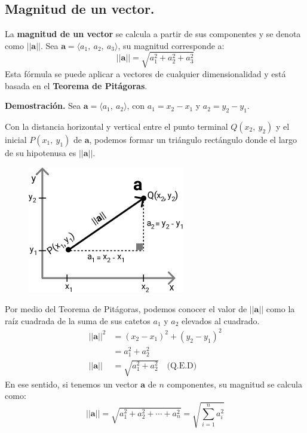 \documentclass[12pt]{article}
\begin{document}
\subsection{Magnitud de un vector.}

La \textbf{magnitud de un vector} se calcula a partir de sus componentes y se denota como $||\mathbf{a}||$. Sea $\mathbf{a} = \langle a_{1}, \ a_{2}, \ a_{3} \rangle$, su magnitud corresponde a:
\[
  ||\mathbf{a}|| = \sqrt{a_{1}^{2} + a_{2}^{2} + a_{3}^{2}}
\]
Esta fórmula se puede aplicar a vectores de cualquier dimensionalidad y está basada en el \textbf{Teorema de Pitágoras}.

\textbf{Demostración.} Sea $\mathbf{a} = \langle a_{1}, \ a_{2} \rangle$, con $a_{1} = x_{2} - x_{1}$ y $a_{2} = y_{2} - y_{1}$.

Con la distancia horizontal y vertical entre el punto terminal $Q(x_{2}, \ y_{2})$ y el inicial $P(x_{1}, \ y_{1})$ de $\mathbf{a}$, podemos formar un triángulo rectángulo donde el largo de su hipotenusa es $||\mathbf{a}||$.

\begin{figure}[hbt!]
\centering
\includegraphics[scale=0.65]{img/magn-proof.jpg}
\end{figure}

Por medio del Teorema de Pitágoras, podemos conocer el valor de $||\mathbf{a}||$ como la raíz cuadrada de la suma de sus catetos $a_{1}$ y $a_{2}$ elevados al cuadrado.
\begin{align*}
  ||\mathbf{a}||^{2} &= (x_{2} - x_1)^{2} + (y_{2} - y_{1})^{2} \\
                     &= a_{1}^{2} + a_{2}^{2} \\
      ||\mathbf{a}|| &= \sqrt{a_{1}^{2} + a_{2}^{2}} \quad \text{(Q.E.D)}
\end{align*}
En ese sentido, si tenemos un vector $\mathbf{a}$ de $n$ componentes, su magnitud se calcula como:
\[
  ||\mathbf{a}|| = \sqrt{a_{1}^{2} + a_{2}^{2} + \cdots + a_{n}^{2}} = \sqrt{\sum_{i = 1}^{n} a_{i}^{2}}
\]
\end{document}

